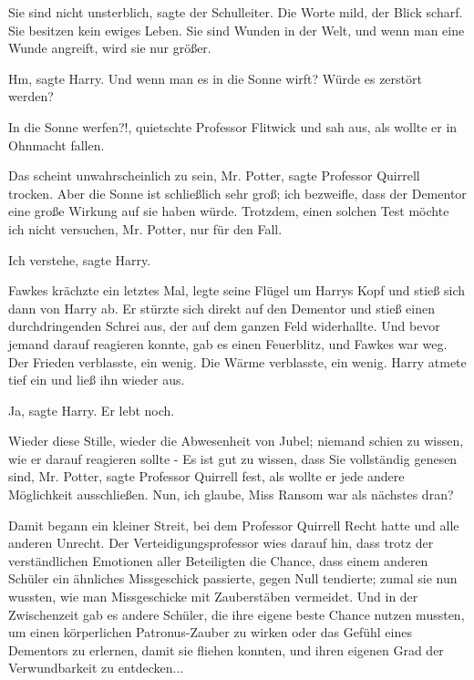 \glqq{}Sie sind nicht unsterblich\grqq{}, sagte der Schulleiter. Die Worte mild,
der Blick scharf. \glqq{}Sie besitzen kein ewiges Leben. Sie sind Wunden in der
Welt, und wenn man eine Wunde angreift, wird sie nur größer.\grqq{}

\glqq{}Hm\grqq{}, sagte Harry. \glqq{}Und wenn man es in die Sonne wirft? Würde es
zerstört werden?\grqq{}

\glqq{}In die Sonne werfen?!\grqq{}, quietschte Professor Flitwick und sah aus,
als wollte er in Ohnmacht fallen.

\glqq{}Das scheint unwahrscheinlich zu sein, Mr. Potter\grqq{}, sagte Professor
Quirrell trocken. \glqq{}Aber die Sonne ist schließlich sehr groß; ich bezweifle,
dass der Dementor eine große Wirkung auf sie haben würde. Trotzdem, einen
solchen Test möchte ich nicht versuchen, Mr. Potter, nur für den Fall.\grqq{}

\glqq{}Ich verstehe\grqq{}, sagte Harry.

Fawkes krächzte ein letztes Mal, legte seine Flügel um Harrys Kopf und stieß
sich dann von Harry ab. Er stürzte sich direkt auf den Dementor und stieß einen
durchdringenden Schrei aus, der auf dem ganzen Feld widerhallte. Und bevor
jemand darauf reagieren konnte, gab es einen Feuerblitz, und Fawkes war weg. Der
Frieden verblasste, ein wenig. Die Wärme verblasste, ein wenig. Harry atmete
tief ein und ließ ihn wieder aus.

\glqq{}Ja\grqq{}, sagte Harry. \glqq{}Er lebt noch.\grqq{}

Wieder diese Stille, wieder die Abwesenheit von Jubel; niemand schien zu wissen,
wie er darauf reagieren sollte - \glqq{}Es ist gut zu wissen, dass Sie
vollständig genesen sind, Mr. Potter\grqq{}, sagte Professor Quirrell fest, als
wollte er jede andere Möglichkeit ausschließen. \glqq{}Nun, ich glaube, Miss
Ransom war als nächstes dran?\grqq{}

Damit begann ein kleiner Streit, bei dem Professor Quirrell Recht hatte und alle
anderen Unrecht. Der Verteidigungsprofessor wies darauf hin, dass trotz der
verständlichen Emotionen aller Beteiligten die Chance, dass einem anderen
Schüler ein ähnliches Missgeschick passierte, gegen Null tendierte; zumal sie
nun wussten, wie man Missgeschicke mit Zauberstäben vermeidet. Und in der
Zwischenzeit gab es andere Schüler, die ihre eigene beste Chance nutzen mussten,
um einen körperlichen Patronus-Zauber zu wirken oder das Gefühl eines Dementors
zu erlernen, damit sie fliehen konnten, und ihren eigenen Grad der
Verwundbarkeit zu entdecken...


